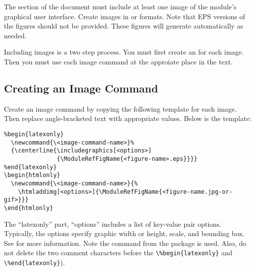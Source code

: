 \documentclass[11pt]{article}
\begin{document}
The  section of the document must include at
least one image of the module's graphical user interface. Create
images in   or  formats.  Note that EPS versions of the
figures should not be provided. These figures will generate automatically as needed.

Including images is a two step process.  You must first create an
 for each image.   Then you must use each
image command at the approiate place in the text.


\subsection{Creating an Image Command}
\label{sec:crimgcmd}

Create an image command by  copying the
following template for each image.  Then
replace angle-bracketed text with appropriate values.  Below is the template:

\begin{verbatim}
%begin{latexonly}
  \newcommand{\<image-command-name>}%
  {\centerline{\includegraphics[<options>]
               {\ModuleRefFigName{<figure-name>.eps}}}}
%end{latexonly}
\begin{htmlonly}
  \newcommand{\<image-command-name>}{%
    \htmladdimg[<options>]{\ModuleRefFigName{<figure-name.jpg-or-gif>}}}
\end{htmlonly}
\end{verbatim}



The ``latexonly'' part, ``options'' includes a list of key-value pair options.
Typically, the options specify graphic width or height, scale, and bounding
box.  See  for more information.  Note
the  command from the
 package is used. Also, do not delete the two
comment characters before the \verb|\%begin{latexonly}| and
\verb|\%end{latexonly}|). 
\end{document}
